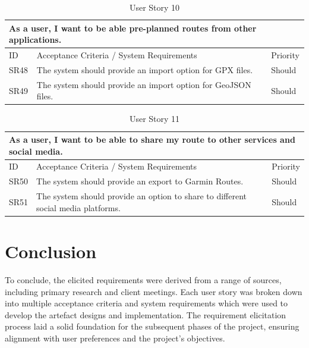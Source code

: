 \begin{table}[!htb]
  \caption{User Story 10}
  \label{tab:user-story-10}
  \begin{tabular}{ m{1cm} m{11cm} m{1cm} }
  \hline
  \multicolumn{3}{p{13cm}}{As a user, I want to be able pre-planned routes from other applications.}\\ 
  \hline
  ID & Acceptance Criteria / System Requirements & Priority\\
  \hline
  \label{SR:48}SR48 & The system should provide an import option for GPX files. & Should\\
  \label{SR:49}SR49 & The system should provide an import option for GeoJSON files. & Should\\
  \hline
  \end{tabular}
\end{table}

\begin{table}[!htb]
  \caption{User Story 11}
  \label{tab:user-story-11}
  \begin{tabular}{ m{1cm} m{11cm} m{1cm} }
  \hline
  \multicolumn{3}{p{13cm}}{As a user, I want to be able to share my route to other services and social media.}\\ 
  \hline
  ID & Acceptance Criteria / System Requirements & Priority\\
  \hline
  \label{SR:50}SR50 & The system should provide an export to Garmin Routes. & Should\\
  \label{SR:51}SR51 & The system should provide an option to share to different social media platforms. & Should\\
  \hline
  \end{tabular}
\end{table}

\section{Conclusion}
\label{requirements:conclusion}

To conclude, the elicited requirements were derived from a range of sources, including primary research and client meetings. Each user story was broken down into multiple acceptance criteria and system requirements which were used to develop the artefact designs and implementation. The requirement elicitation process laid a solid foundation for the subsequent phases of the project, ensuring alignment with user preferences and the project's objectives. 